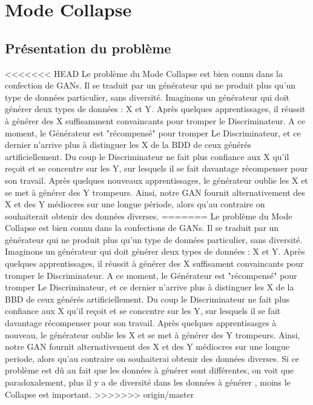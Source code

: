 \section{Mode Collapse}
	\subsection{Présentation du problème}
<<<<<<< HEAD
		Le problème du Mode Collapse est bien connu dans la confection de GANs. Il se traduit par un générateur qui ne produit plus qu'un type de données particulier, sans diversité. 
		Imaginons un générateur qui doit générer deux types de données : X et Y. Après quelques apprentissages, il réussit à générer des X suffisamment convaincants pour tromper le Discriminateur. A ce moment, le Générateur est "récompensé" pour tromper Le Discriminateur, et ce dernier n'arrive plus à distinguer les X de la BDD de ceux générés artificiellement. Du coup le Discriminateur ne fait plus confiance aux X qu'il reçoit et se concentre sur les Y, sur lesquels il se fait davantage récompenser pour son travail. Après quelques nouveaux apprentissages, le générateur oublie les X et se met à générer des Y trompeurs.
		Ainsi, notre GAN fournit alternativement des X et des Y médiocres sur une longue période, alors qu'au contraire on souhaiterait obtenir des données diverses.
=======
		Le problème du Mode Collapse est bien connu dans la confections de GANs. Il se traduit par un générateur qui ne produit plus qu'un type de données particulier, sans diversité. 
		Imaginons un générateur qui doit générer deux types de données : X et Y. Après quelques apprentissages, il réussit à générer des X suffisament convaincants pour tromper le Discriminateur. A ce moment, le Générateur est "récompensé" pour tromper Le Discriminateur, et ce dernier n'arrive plus à distinguer les X de la BBD de ceux générés artificiellement. Du coup le Discriminateur ne fait plus confiance aux X qu'il reçoit et se concentre sur les Y, sur lesquels il se fait davantage récompenser pour son travail. Après quelques apprentisasges à nouveau, le générateur oublie les X et se met à générer des Y trompeurs.
		Ainsi, notre GAN fournit alternativement des X et des Y médiocres sur une longue periode, alors qu'au contraire on souhaiterai obtenir des données diverses. Si ce problème est dû au fait que les données à générer sont différentes, on voit que paradoxalement, plus il y a de diversité dans les données à générer ,  moins le Collapse est important.
>>>>>>> origin/master
